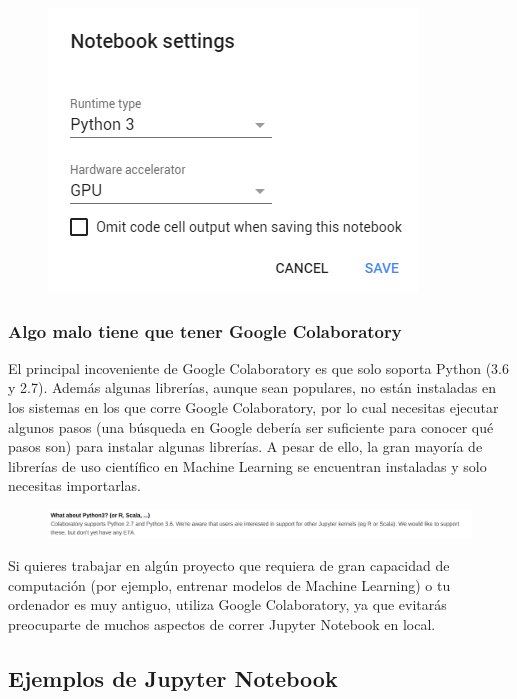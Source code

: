 \documentclass[11pt]{article}
\makeatletter
\def\maxwidth{\ifdim\Gin@nat@width>\linewidth\linewidth
    \else\Gin@nat@width\fi}
\let\Oldincludegraphics\includegraphics
\renewcommand{\includegraphics}[1]{\Oldincludegraphics[width=.8\maxwidth]{#1}}
\makeatother
\begin{document}
    \begin{figure}
\centering
\includegraphics{gcolab-gpu.png}
\caption{}
\end{figure}

    \subsubsection{Algo malo tiene que tener Google
Colaboratory}\label{algo-malo-tiene-que-tener-google-colaboratory}

    El principal incoveniente de Google Colaboratory es que solo soporta
Python (3.6 y 2.7). Además algunas librerías, aunque sean populares, no
están instaladas en los sistemas en los que corre Google Colaboratory,
por lo cual necesitas ejecutar algunos pasos (una búsqueda en Google
debería ser suficiente para conocer qué pasos son) para instalar algunas
librerías. A pesar de ello, la gran mayoría de librerías de uso
científico en Machine Learning se encuentran instaladas y solo necesitas
importarlas.

    \begin{figure}
\centering
\includegraphics{gcolab-other-lang.png}
\caption{}
\end{figure}

    Si quieres trabajar en algún proyecto que requiera de gran capacidad de
computación (por ejemplo, entrenar modelos de Machine Learning) o tu
ordenador es muy antiguo, utiliza Google Colaboratory, ya que evitarás
preocuparte de muchos aspectos de correr Jupyter Notebook en local.

    \subsection{Ejemplos de Jupyter
Notebook}\label{ejemplos-de-jupyter-notebook}
\end{document}
